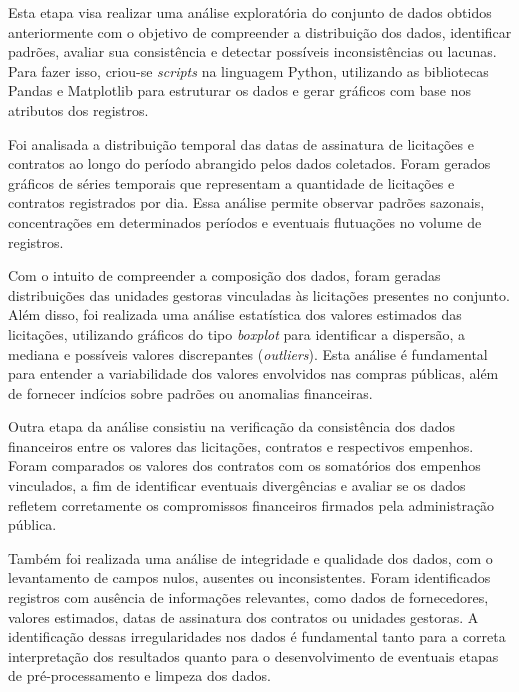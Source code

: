 \documentclass[
	12pt,				%
	oneside,			%
	a4paper,			%
	chapter=TITLE,		%
	section=TITLE,		%
	english,			%
	brazil				%
	]{abntex2}
\newcommand{\attention}[1]{{\color{red}\textbf{#1}}}
\begin{document}

Esta etapa visa realizar uma análise exploratória do conjunto de dados obtidos anteriormente com o objetivo de compreender a distribuição dos dados, identificar padrões, avaliar sua consistência e detectar possíveis inconsistências ou lacunas. Para fazer isso, criou-se \textit{scripts} na linguagem Python, utilizando as bibliotecas Pandas e Matplotlib para estruturar os dados e gerar gráficos com base nos atributos dos registros.

Foi analisada a distribuição temporal das datas de assinatura de licitações e contratos ao longo do período abrangido pelos dados coletados. Foram gerados gráficos de séries temporais que representam a quantidade de licitações e contratos registrados por dia. Essa análise permite observar padrões sazonais, concentrações em determinados períodos e eventuais flutuações no volume de registros.

Com o intuito de compreender a composição dos dados, foram geradas distribuições das unidades gestoras vinculadas às licitações presentes no conjunto. Além disso, foi realizada uma análise estatística dos valores estimados das licitações, utilizando gráficos do tipo \textit{boxplot} para identificar a dispersão, a mediana e possíveis valores discrepantes (\textit{outliers}). Esta análise é fundamental para entender a variabilidade dos valores envolvidos nas compras públicas, além de fornecer indícios sobre padrões ou anomalias financeiras.

Outra etapa da análise consistiu na verificação da consistência dos dados financeiros entre os valores das licitações, contratos e respectivos empenhos. Foram comparados os valores dos contratos com os somatórios dos empenhos vinculados, a fim de identificar eventuais divergências e avaliar se os dados refletem corretamente os compromissos financeiros firmados pela administração pública.

Também foi realizada uma análise de integridade e qualidade dos dados, com o levantamento de campos nulos, ausentes ou inconsistentes. Foram identificados registros com ausência de informações relevantes, como dados de fornecedores, valores estimados, datas de assinatura dos contratos ou unidades gestoras. A identificação dessas irregularidades nos dados é fundamental tanto para a correta interpretação dos resultados quanto para o desenvolvimento de eventuais etapas de pré-processamento e limpeza dos dados.
\end{document}
